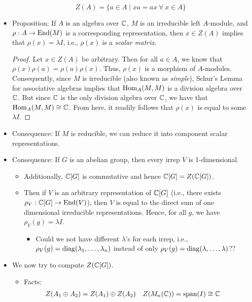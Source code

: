 \documentclass[../notes.tex]{subfiles}
\begin{document}
\begin{itemize}
    \begin{equation*}
        Z(A) = \{a\in A\mid xa=ax\ \forall\ x\in A\}
    \end{equation*}
    \item Proposition: If $A$ is an algebra over $\mathbb{C}$, $M$ is an irreducible left $A$-module, and $\rho:A\to\operatorname{End}(M)$ is a corresponding representation, then $x\in Z(A)$ implies that $\rho(x)=\lambda I$, i.e., $\rho(x)$ is a \emph{scalar matrix}.
    \begin{proof}
        Let $x\in Z(A)$ be arbitrary. Then for all $a\in A$, we know that $\rho(x)\rho(a)=\rho(a)\rho(x)$. Thus, $\rho(x)$ is a morphism of $A$-modules. Consequently, since $M$ is irreducible (also known as \emph{simple}), Schur's Lemma for associative algebras implies that $\operatorname{Hom}_A(M,M)$ is a division algebra over $\mathbb{C}$. But since $\mathbb{C}$ is the only division algebra over $\mathbb{C}$, we have that $\operatorname{Hom}_A(M,M)\cong\mathbb{C}$. From here, it readily follows that $\rho(x)$ is equal to some $\lambda I$.
    \end{proof}
    \item Consequence: If $M$ is reducible, we can reduce it into component scalar representations.
    \item Consequence: If $G$ is an abelian group, then every irrep $V$ is 1-dimensional.
    \begin{itemize}
        \item Additionally, $\mathbb{C}[G]$ is commutative and hence $\mathbb{C}[G]=Z(\mathbb{C}[G])$.
        \item Then if $V$ is an arbitrary representation of $\mathbb{C}[G]$ (i.e., there exists $\rho_V:\mathbb{C}[G]\to\operatorname{End}(V)$), then $V$ is equal to the direct sum of one dimensional irreducible representations. Hence, for all $g$, we have $\rho_V(g)=\lambda I$.
        \begin{itemize}
            \item Could we not have different $\lambda$'s for each irrep, i.e., $\rho_V(g)=\operatorname{diag}(\lambda_1,\dots,\lambda_n)$ instead of only $\rho_V(g)=\operatorname{diag}(\lambda,\dots,\lambda)$??
        \end{itemize}
    \end{itemize}
    \item We now try to compute $Z(\mathbb{C}[G])$.
    \begin{itemize}
        \item Facts:
        \begin{align*}
            Z(A_1\oplus A_2) &= Z(A_1)\oplus Z(A_2)&
            Z(M_n(\mathbb{C})) &= \operatorname{span}(I) \cong \mathbb{C}
        \end{align*}

\end{itemize}
\end{itemize}
\end{document}

